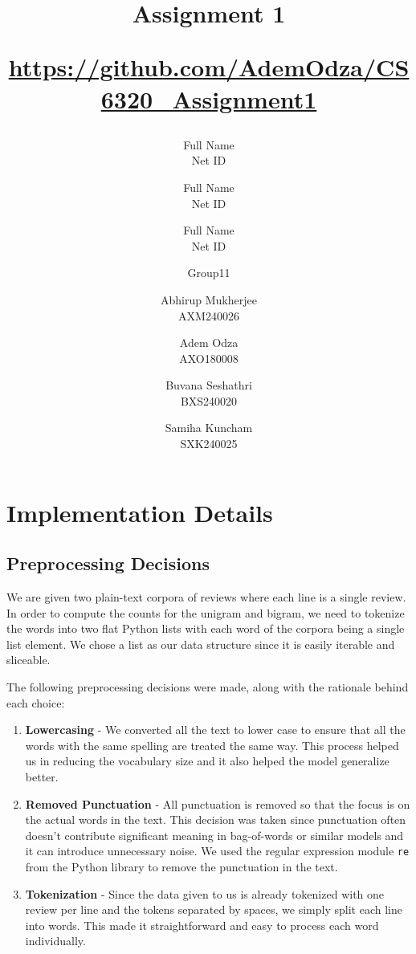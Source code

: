 \documentclass[a4paper]{article}
\title{Assignment 1 \\ \begin{small}\url{https://github.com/AdemOdza/CS6320_Assignment1}\end{small}}
\author{Full Name \\ Net ID \and Full Name \\ Net ID \and Full Name \\ Net ID}
\author{Group11 \and  Abhirup Mukherjee \\ AXM240026 \and Adem Odza \\ AXO180008  \and Buvana Seshathri \\ BXS240020 \and Samiha Kuncham \\SXK240025}
\date{}
\begin{document}
\maketitle



\section{Implementation Details}





\subsection{Preprocessing Decisions}
We are given two plain-text corpora of reviews where each line is a single review. In order to compute the counts for the unigram and bigram, we need to tokenize the words into two flat Python lists with each word of the corpora being a single list element. We chose a list as our data structure since it is easily iterable and sliceable.

The following preprocessing decisions were made, along with the rationale behind each choice:

\begin{enumerate}
    \item \textbf{Lowercasing} - We converted all the text to lower case to ensure that all the words with the same spelling are treated the same way. This process helped us in reducing the vocabulary size and it also helped the model generalize better.

    \item \textbf{Removed Punctuation} - All punctuation is removed so that the focus is on the actual words in the text. This decision was taken since punctuation often doesn't contribute significant meaning in bag-of-words or similar models and it can introduce unnecessary noise. We used the regular expression module \texttt{re} from the Python library to remove the punctuation in the text.

    \item \textbf{Tokenization} - Since the data given to us is already tokenized with one review per line and the tokens separated by spaces, we simply split each line into words. This made it straightforward and easy to process each word individually.
\end{enumerate}
\end{document}

